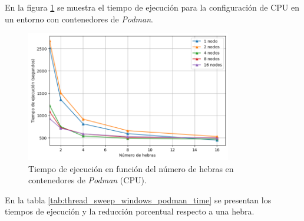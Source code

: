 En la figura \ref{fig:thread_sweep_windows_podman_time} se muestra el tiempo de ejecución para la configuración de CPU en un entorno con contenedores de \textit{Podman}.

\begin{figure}[ht]
    \centering
    \includegraphics[width=0.8\textwidth]{imagenes/cap5/thread_sweep_windows_podman_time.png}
    \caption{Tiempo de ejecución en función del número de hebras en contenedores de \textit{Podman} (CPU).}
    \label{fig:thread_sweep_windows_podman_time}
\end{figure}

En la tabla \ref{tab:thread_sweep_windows_podman_time} se presentan los tiempos de ejecución y la reducción porcentual respecto a una hebra.

